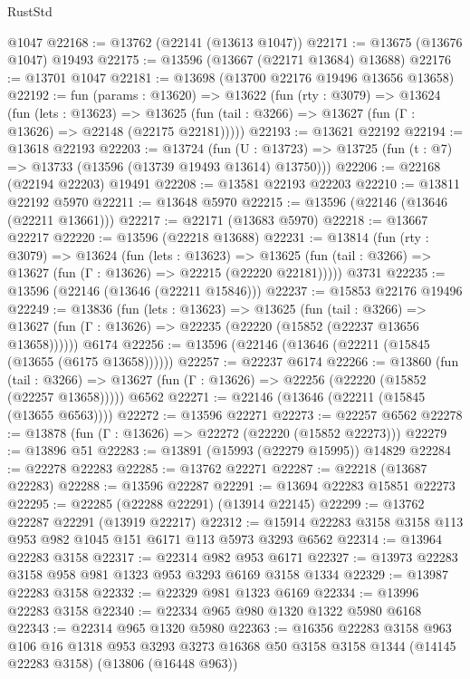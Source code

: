 \begin{lexlean}{RustStd}
\begin{coremodule}
    @1047
@22168 := @13762 (@22141 (@13613 @1047))
@22171 := @13675 (@13676 @1047) @19493
@22175 := @13596 (@13667 (@22171 @13684) @13688)
@22176 := @13701 @1047
@22181 := @13698 (@13700 @22176 @19496 @13656 @13658)
@22192 := fun (params : @13620) =>
  @13622
    (fun (rty : @3079) =>
    @13624
      (fun (lets : @13623) =>
      @13625 (fun (tail : @3266) => @13627 (fun (Γ : @13626) => @22148 (@22175 @22181)))))
@22193 := @13621 @22192
@22194 := @13618 @22193
@22203 := @13724
    (fun (U : @13723) => @13725 (fun (t : @7) => @13733 (@13596 (@13739 @19493 @13614) @13750)))
@22206 := @22168 (@22194 @22203) @19491
@22208 := @13581 @22193 @22203
@22210 := @13811 @22192 @5970
@22211 := @13648 @5970
@22215 := @13596 (@22146 (@13646 (@22211 @13661)))
@22217 := @22171 (@13683 @5970)
@22218 := @13667 @22217
@22220 := @13596 (@22218 @13688)
@22231 := @13814
    (fun (rty : @3079) =>
    @13624
      (fun (lets : @13623) =>
      @13625 (fun (tail : @3266) => @13627 (fun (Γ : @13626) => @22215 (@22220 @22181)))))
    @3731
@22235 := @13596 (@22146 (@13646 (@22211 @15846)))
@22237 := @15853 @22176 @19496
@22249 := @13836
    (fun (lets : @13623) =>
    @13625
      (fun (tail : @3266) =>
      @13627 (fun (Γ : @13626) => @22235 (@22220 (@15852 (@22237 @13656 @13658))))))
    @6174
@22256 := @13596 (@22146 (@13646 (@22211 (@15845 (@13655 (@6175 @13658))))))
@22257 := @22237 @6174
@22266 := @13860
    (fun (tail : @3266) => @13627 (fun (Γ : @13626) => @22256 (@22220 (@15852 (@22257 @13658)))))
    @6562
@22271 := @22146 (@13646 (@22211 (@15845 (@13655 @6563))))
@22272 := @13596 @22271
@22273 := @22257 @6562
@22278 := @13878 (fun (Γ : @13626) => @22272 (@22220 (@15852 @22273)))
@22279 := @13896 @51
@22283 := @13891 (@15993 (@22279 @15995)) @14829
@22284 := @22278 @22283
@22285 := @13762 @22271
@22287 := @22218 (@13687 @22283)
@22288 := @13596 @22287
@22291 := @13694 @22283 @15851 @22273
@22295 := @22285 (@22288 @22291) (@13914 @22145)
@22299 := @13762 @22287 @22291 (@13919 @22217)
@22312 := @15914 @22283 @3158 @3158 @113 @953 @982 @1045 @151 @6171 @113 @5973 @3293 @6562
@22314 := @13964 @22283 @3158
@22317 := @22314 @982 @953 @6171
@22327 := @13973 @22283 @3158 @958 @981 @1323 @953 @3293 @6169 @3158 @1334
@22329 := @13987 @22283 @3158
@22332 := @22329 @981 @1323 @6169
@22334 := @13996 @22283 @3158
@22340 := @22334 @965 @980 @1320 @1322 @5980 @6168
@22343 := @22314 @965 @1320 @5980
@22363 := @16356
    @22283
    @3158
    @963
    @106
    @16
    @1318
    @953
    @3293
    @3273
    @16368
    @50
    @3158
    @3158
    @1344
    (@14145 @22283 @3158)
    (@13806 (@16448 @963))

\end{coremodule}
\end{lexlean}
